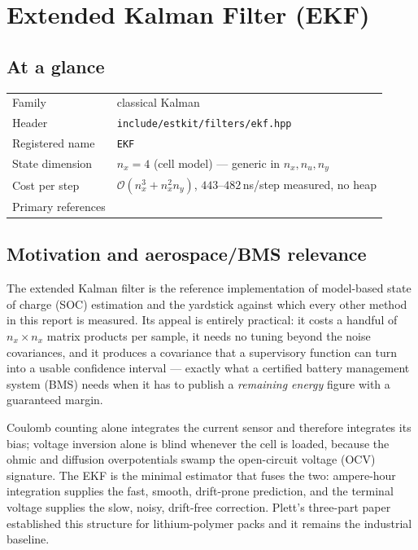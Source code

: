 \chapter{Extended Kalman Filter (EKF)}
\label{ch:ekf}

\section*{At a glance}
\begin{tabular}{@{}l>{\raggedright\arraybackslash}p{}@{}}
Family & classical Kalman \\
Header & \texttt{include/estkit/filters/ekf.hpp} \\
Registered name & \texttt{EKF} \\
State dimension & $n_x = 4$ (cell model) --- generic in $n_x, n_u, n_y$ \\
Cost per step & $\mathcal{O}(n_x^3 + n_x^2 n_y)$, $443$--$482$\,ns/step measured, no heap \\
Primary references & \cite{kalman1960,jazwinski1970,plett2004ekf3,bucyjoseph1968} \\
\end{tabular}

\section{Motivation and aerospace/BMS relevance}
The extended Kalman filter is the reference implementation of model-based state of charge
(SOC) estimation and the yardstick against which every other method in this report is
measured. Its appeal is entirely practical: it costs a handful of $n_x\times n_x$ matrix
products per sample, it needs no tuning beyond the noise covariances, and it produces a
covariance that a supervisory function can turn into a usable confidence interval --- exactly
what a certified battery management system (BMS) needs when it has to publish a
\emph{remaining energy} figure with a guaranteed margin.

Coulomb counting alone integrates the current sensor and
therefore integrates its bias; voltage inversion alone is
blind whenever the cell is loaded, because the ohmic and diffusion overpotentials swamp the
open-circuit voltage (OCV) signature. The EKF is the minimal estimator that fuses the two:
ampere-hour integration supplies the fast, smooth, drift-prone prediction, and the terminal
voltage supplies the slow, noisy, drift-free correction. Plett's three-part
paper~\cite{plett2004ekf1,plett2004ekf2,plett2004ekf3} established this structure for
lithium-polymer packs and it remains the industrial baseline.

